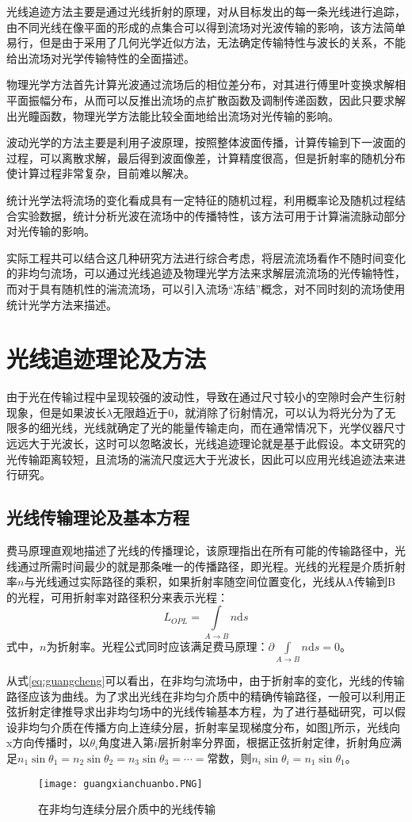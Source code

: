 光线追迹方法主要是通过光线折射的原理，对从目标发出的每一条光线进行追踪，由不同光线在像平面的形成的点集合可以得到流场对光波传输的影响，该方法简单易行，但是由于采用了几何光学近似方法，无法确定传输特性与波长的关系，不能给出流场对光学传输特性的全面描述。

物理光学方法首先计算光波通过流场后的相位差分布，对其进行傅里叶变换求解相平面振幅分布，从而可以反推出流场的点扩散函数及调制传递函数，因此只要求解出光瞳函数，物理光学方法能比较全面地给出流场对光传输的影响。

波动光学的方法主要是利用子波原理，按照整体波面传播，计算传输到下一波面的过程，可以离散求解，最后得到波面像差，计算精度很高，但是折射率的随机分布使计算过程非常复杂，目前难以解决。

统计光学法将流场的变化看成具有一定特征的随机过程，利用概率论及随机过程结合实验数据，统计分析光波在流场中的传播特性，该方法可用于计算湍流脉动部分对光传输的影响。

实际工程共可以结合这几种研究方法进行综合考虑，将层流流场看作不随时间变化的非均匀流场，可以通过光线追迹及物理光学方法来求解层流流场的光传输特性，而对于具有随机性的湍流流场，可以引入流场“冻结”概念，对不同时刻的流场使用统计光学方法来描述。
\section{光线追迹理论及方法}
由于光在传输过程中呈现较强的波动性，导致在通过尺寸较小的空隙时会产生衍射现象，但是如果波长$\lambda$无限趋近于0，就消除了衍射情况，可以认为将光分为了无限多的细光线，光线就确定了光的能量传输走向，而在通常情况下，光学仪器尺寸远远大于光波长，这时可以忽略波长，光线追迹理论就是基于此假设。本文研究的光传输距离较短，且流场的湍流尺度远大于光波长，因此可以应用光线追迹法来进行研究。
\subsection{光线传输理论及基本方程}
费马原理直观地描述了光线的传播理论，该原理指出在所有可能的传输路径中，光线通过所需时间最少的就是那条唯一的传播路径，即光程。光线的光程是介质折射率$n$与光线通过实际路径的乘积，如果折射率随空间位置变化，光线从A传输到B的光程，可用折射率对路径积分来表示光程：
\begin{equation}
L_{OPL}=\int\limits_{A\to B}\!\!\!n\mathrm{d}s
\label{eq:guangcheng}
\end{equation}
式中，$n$为折射率。光程公式同时应该满足费马原理：$\partial\!\!\!\int\limits_{A\to B}\!\!\!n\mathrm{d}s=0$。

从式\eqref{eq:guangcheng}可以看出，在非均匀流场中，由于折射率的变化，光线的传输路径应该为曲线。为了求出光线在非均匀介质中的精确传输路径，一般可以利用正弦折射定律推导求出非均匀场中的光线传输基本方程，为了进行基础研究，可以假设非均匀介质在传播方向上连续分层，折射率呈现梯度分布，如图\ref{fig:guangxianchuanshu}所示，光线向x方向传播时，以$\theta_i$角度进入第$i$层折射率分界面，根据正弦折射定律，折射角应满足$n_1\sin\theta_1=n_2\sin\theta_2=n_3\sin\theta_3=\cdots=\text{常数}$，则$n_i\sin\theta_i=n_1\sin\theta_1$。
\begin{figure}[bhtp]
\centering
\texttt{[image: guangxianchuanbo.PNG]}
\caption{在非均匀连续分层介质中的光线传输}
\label{fig:guangxianchuanshu}
\end{figure}

